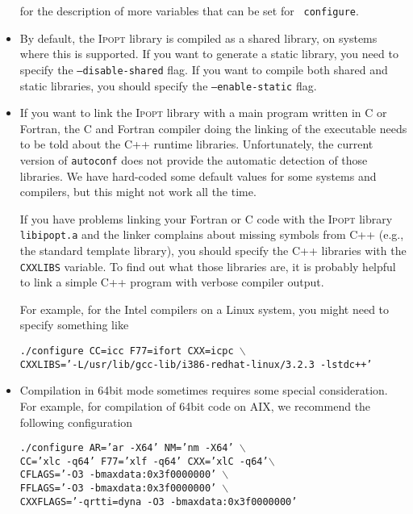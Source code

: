 \documentclass[10pt]{article}
\newcommand{\Ipopt}{\textsc{Ipopt}\xspace}
\begin{document}
\begin{itemize}
  for the description of more variables that can be set for {\tt
    configure}.

\item By default, the \Ipopt library is compiled as a shared library,
  on systems where this is supported.  If you want to generate a
  static library, you need to specify the {\tt --disable-shared}
  flag.  If you want to compile both shared and static libraries, you
  should specify the {\tt --enable-static} flag.

\item If you want to link the \Ipopt library with a main program
  written in C or Fortran, the C and Fortran compiler doing the
  linking of the executable needs to be told about the C++ runtime
  libraries.  Unfortunately, the current version of {\tt autoconf}
  does not provide the automatic detection of those libraries.  We
  have hard-coded some default values for some systems and compilers,
  but this might not work all the time.

  If you have problems linking your Fortran or C code with the \Ipopt
  library {\tt libipopt.a} and the linker complains about missing
  symbols from C++ (e.g., the standard template library), you should
  specify the C++ libraries with the {\tt CXXLIBS} variable.  To find out
  what those libraries are, it is probably helpful to link a  simple C++
  program with verbose compiler output.

  For example, for the Intel compilers on a Linux system, you
  might need to specify something like

  {\tt ./configure CC=icc F77=ifort CXX=icpc $\backslash$\\ \hspace*{14ex} CXXLIBS='-L/usr/lib/gcc-lib/i386-redhat-linux/3.2.3 -lstdc++'}

\item Compilation in 64bit mode sometimes requires some special
  consideration.  For example, for compilation of 64bit code on AIX,
  we recommend the following configuration

  {\tt ./configure AR='ar -X64' NM='nm -X64' $\backslash$\\
    \hspace*{14ex} CC='xlc -q64' F77='xlf -q64' CXX='xlC
    -q64'$\backslash$\\ \hspace*{14ex} CFLAGS='-O3
    -bmaxdata:0x3f0000000'
    $\backslash$\\ \hspace*{14ex} FFLAGS='-O3 -bmaxdata:0x3f0000000' $\backslash$\\
    \hspace*{14ex} CXXFLAGS='-qrtti=dyna -O3 -bmaxdata:0x3f0000000'}


\end{itemize}
\end{document}
